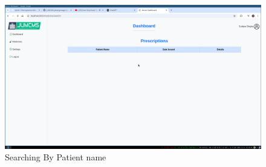 \documentclass[a4paper,12pt]{article}
\begin{document}
\begin{figure}[H]
    \centering
    \includegraphics[width=\textwidth]{images/spr1output4.png}
    \caption{Searching By Patient name}
\end{figure}
\end{document}
